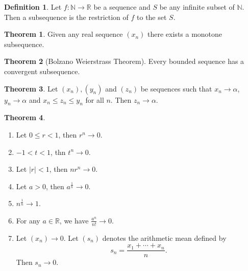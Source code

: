 \documentclass{article}
\theoremstyle{definition}
\newtheorem{theorem}{Theorem}
\newtheorem{definition}{Definition}
\begin{document}
    \begin{definition}
        Let $f:\mathbb{N} \to \mathbb{R} $ be a sequence and $S$ be any infinite subset of $\mathbb{N} $. Then a subsequence is the restriction of $f$ to the set $S$.
    \end{definition}

    \begin{theorem}
        Given any real sequence $\left( x_n \right) $ there exists a monotone subsequence. 
    \end{theorem}
    \begin{theorem}[Bolzano Weierstrass Theorem]
        Every bounded sequence has a convergent subsequence.
    \end{theorem}

    \begin{theorem}
        Let $\left( x_n \right) ,\left( y_n \right) $ and $\left( z_n \right) $ be sequences such that $x_n\to \alpha $, $y_n\to  \alpha $ and $x_n \leq  z_n \leq y_n$ for all $n$. Then $z_n \to \alpha $.
    \end{theorem}

    \begin{theorem}
        \begin{enumerate}
            \item Let $0\leq r < 1$, then $r^n\to 0$.
            \item $-1 < t < 1$, thn $t^n \to  0$.
            \item Let $\vert r \vert < 1$, then $nr^n \to  0$.
            \item Let $a>0$, then $a^{\frac{1}{n}}\to  0$.
            \item $n^{\frac{1}{n}}\to  1$.
            \item For any $a\in \mathbb{R} $, we have $\frac{a^n}{n!}\to 0$.  
            \item Let $\left( x_n \right)\to 0 $. Let $\left( s_n \right) $ denotes the arithmetic mean defined by 
            \[
                s_n = \frac{x_1+ \cdots + x_n}{n}.
            \]
            Then $s_n \to 0$.
        \end{enumerate}
    \end{theorem}
\end{document}
